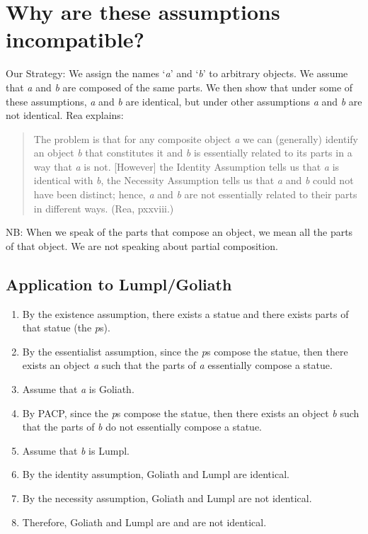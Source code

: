 \documentclass[9pt]{article}
\begin{document}
\section{Why are these assumptions incompatible?} 

Our Strategy: We assign the names `\emph{a}' and `\emph{b}' to arbitrary objects. We assume  that \emph{a} and \emph{b} are composed of the same parts. We then show that under some of these assumptions, \emph{a} and \emph{b} are identical, but under other assumptions \emph{a} and  \emph{b} are not identical. Rea explains: 
\begin{quote}The problem is that for any composite object \emph{a} we can (generally) identify an object \emph{b} that constitutes it and \emph{b} is essentially related to its parts in a way that \emph{a} is not. [However] the  Identity Assumption tells us that \emph{a} is identical with \emph{b}, the Necessity Assumption tells us that \emph{a} and \emph{b} could not have been distinct; hence, \emph{a} and \emph{b} are not essentially related to their parts in different ways. (Rea, pxxviii.) 
\end{quote}
NB: When we speak of the parts that compose an object, we mean all the parts of  that object. We are not speaking about partial composition.

\subsection*{Application to Lumpl/Goliath} 
\begin{enumerate}
\item By the existence assumption, there exists a statue and there exists parts of that  statue (the \emph{p}s). 
\item By the essentialist assumption, since the \emph{p}s compose the statue, then there  exists an object \emph{a} such that the parts of \emph{a} essentially compose a statue. 
\item Assume that \emph{a} is Goliath. 
\item By PACP, since the \emph{p}s compose the statue, then there exists an object \emph{b}  such that the parts of \emph{b} do not essentially compose a statue. 
\item Assume that \emph{b} is Lumpl. 
\item By the identity assumption, Goliath and Lumpl are identical. 
\item By the necessity assumption, Goliath and Lumpl are not identical. 
\item Therefore, Goliath and Lumpl are and are not identical. 
\end{enumerate}
\end{document}
